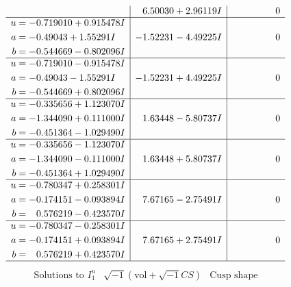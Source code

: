 \documentclass[1p]{elsarticle_modified}
\theoremstyle{definition}
\newcommand{\I}{\sqrt{-1}}
\begin{document}
$$\begin{array}{c|c|c}
 & \phantom{-}6.50030 + 2.96119 I & \phantom{-0.000000 } 0 \\ \hline\begin{aligned}
u &= -0.719010 + 0.915478 I \\
a &= -0.49043 + 1.55291 I \\
b &= -0.544669 - 0.802096 I\end{aligned}
 & -1.52231 - 4.49225 I & \phantom{-0.000000 } 0 \\ \hline\begin{aligned}
u &= -0.719010 - 0.915478 I \\
a &= -0.49043 - 1.55291 I \\
b &= -0.544669 + 0.802096 I\end{aligned}
 & -1.52231 + 4.49225 I & \phantom{-0.000000 } 0 \\ \hline\begin{aligned}
u &= -0.335656 + 1.123070 I \\
a &= -1.344090 + 0.111000 I \\
b &= -0.451364 - 1.029490 I\end{aligned}
 & \phantom{-}1.63448 - 5.80737 I & \phantom{-0.000000 } 0 \\ \hline\begin{aligned}
u &= -0.335656 - 1.123070 I \\
a &= -1.344090 - 0.111000 I \\
b &= -0.451364 + 1.029490 I\end{aligned}
 & \phantom{-}1.63448 + 5.80737 I & \phantom{-0.000000 } 0 \\ \hline\begin{aligned}
u &= -0.780347 + 0.258301 I \\
a &= -0.174151 - 0.093894 I \\
b &= \phantom{-}0.576219 - 0.423570 I\end{aligned}
 & \phantom{-}7.67165 - 2.75491 I & \phantom{-0.000000 } 0 \\ \hline\begin{aligned}
u &= -0.780347 - 0.258301 I \\
a &= -0.174151 + 0.093894 I \\
b &= \phantom{-}0.576219 + 0.423570 I\end{aligned}
 & \phantom{-}7.67165 + 2.75491 I & \phantom{-0.000000 } 0\\
 \hline 
 \end{array}$$\newpage$$\begin{array}{c|c|c}  
\text{Solutions to }I^u_{1}& \I (\text{vol} + \sqrt{-1}CS) & \text{Cusp shape}\\

\end{array}$$
\end{document}
